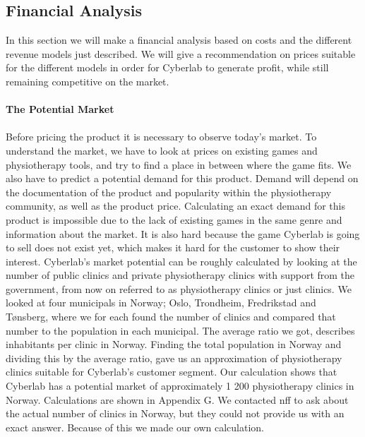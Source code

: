 \subsection{Financial Analysis}
In this section we will make a financial analysis based on costs and the different revenue models just described. We will give a recommendation on prices suitable for the different models in order for Cyberlab to generate profit, while still remaining competitive on the market. \\ \\
\textbf{The Potential Market} \\ \\
Before pricing the product it is necessary to observe today's market. To understand the market, we have to look at prices on existing games and physiotherapy tools, and try to find a place in between where the game fits. We also have to predict a potential demand for this product. Demand will depend on the documentation of the product and popularity within the physiotherapy community, as well as the product price. Calculating an exact demand for this product is impossible due to the lack of existing games in the same genre and information about the market. It is also hard because the game Cyberlab is going to sell does not exist yet, which makes it hard for the customer to show their interest. Cyberlab’s market potential can be roughly calculated by looking at the number of public clinics and private physiotherapy clinics with support from the government, from now on referred to as physiotherapy clinics or just clinics. We looked at four municipals in Norway; Oslo, Trondheim, Fredrikstad and T{ø}nsberg, where we for each found the number of clinics and compared that number to the population in each municipal. The average ratio we got, describes inhabitants per clinic in Norway. Finding the total population in Norway and dividing this by the average ratio, gave us an approximation of physiotherapy clinics suitable for Cyberlab's customer segment. Our calculation shows that Cyberlab has a potential market of approximately 1 200 physiotherapy clinics in Norway. Calculations are shown in Appendix G. We contacted \ac{nff} to ask about the actual number of clinics in Norway, but they could not provide us with an exact answer. Because of this we made our own calculation.\\ \\
